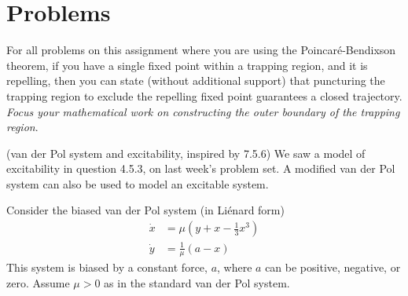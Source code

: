 \documentclass[12pt,letterpaper,answers]{exam}
\begin{document}
\section*{Problems}

For all problems on this assignment where you are using the Poincar\'e-Bendixson theorem, if you have a single fixed point within a trapping region, and it is repelling, then you can state (without additional support) that puncturing the trapping region to exclude the repelling fixed point guarantees a closed trajectory. \emph{Focus your mathematical work on constructing the outer boundary of the trapping region}.

\begin{questions}




\item (van der Pol system and excitability, inspired by 7.5.6)
We saw a model of excitability in question 4.5.3, on last week's problem set.  A modified van der Pol system can also be used to model an excitable system.  

Consider the biased van der Pol system (in Li\'enard form) 
\begin{align*}
\dot x&=\mu\left(y+x-\frac{1}{3}x^3\right)\\
\dot y&=\frac{1}{\mu}(a-x)
\end{align*}  
This system is biased by a constant force, $a$, where $a$ can be positive, negative, or zero.  Assume $\mu > 0$ as in the standard van der Pol system.
\end{questions}
\end{document}
